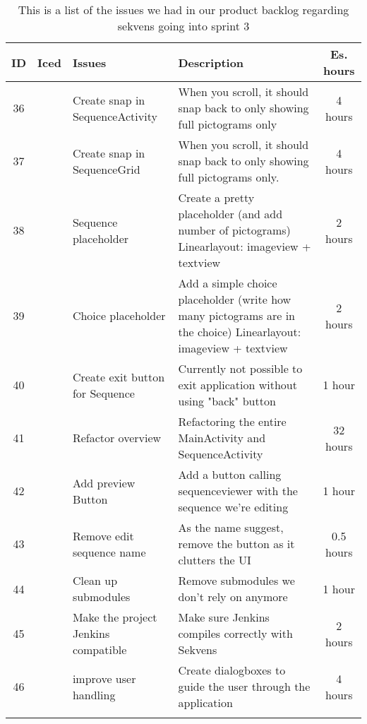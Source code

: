 \begin{longtable} { | c | c | p{5cm} | p{5cm} | c | } 
\hline
	ID 	&	Iced	&	Issues	&	Description		&	 Es. hours \\\hline
	36	& 	 	&	Create snap in SequenceActivity		& 	When you scroll, it should snap back to only showing full pictograms only	 & 4 hours \\\hline
	37	& 	 	&	Create snap in SequenceGrid		& 	When you scroll, it should snap back to only showing full pictograms only.	 & 4 hours \\\hline
	38	&		 &	Sequence placeholder 	 &		Create a pretty placeholder (and add number of pictograms) Linearlayout: imageview + textview			 &	2 hours\\\hline
	39	&		 &	Choice placeholder		 &		Add a simple choice placeholder (write how many pictograms are in the choice) Linearlayout: imageview + textview			 &	2 hours \\\hline
	40	&		& 	Create exit button for Sequence	 &		Currently not possible to exit application without using "back" button	 &	 1 hour		\\\hline
	41	&		 &	Refactor overview		 &		Refactoring the entire MainActivity and SequenceActivity	 &	32 hours \\\hline
	42	&		 &	Add preview Button		 &		Add a button calling sequenceviewer with the sequence we're editing		 & 1 hour	\\\hline
	43	&		 &	Remove edit sequence name	 &	As the name suggest, remove the button as it clutters the UI		 &	0.5 hours \\\hline
	44	&		 & 	Clean up submodules  &		Remove submodules we don't rely on anymore	 &	1 hour\\\hline
	45	&		 &	Make the project Jenkins compatible		 &		Make sure Jenkins compiles correctly with Sekvens			 &	2 hours \\\hline
	46	&		 &	improve user handling 		 &		Create dialogboxes to guide the user through the application		 &	4 hours \\\hline
\caption{This is a list of the issues we had in our product backlog regarding sekvens going into sprint 3}
\label{tab:spr3_prodblog}
\end{longtable}
